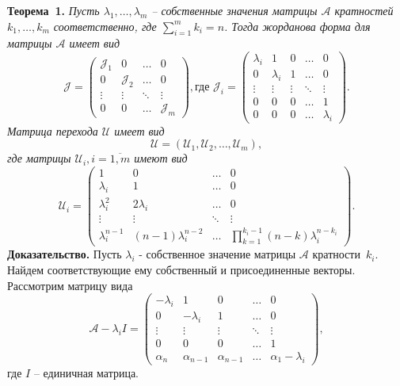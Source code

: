 \textbf{Теорема~1.}
{ \it Пусть $\lambda_1, \ldots , \lambda_m$ -- собственные значения матрицы $\mathcal{A}$ кратностей $k_1, \ldots , k_m$ соответственно, где $\sum\limits_{i=1}^m k_i = n$. Тогда жорданова форма для матрицы $\mathcal{A}$ имеет вид
$$
	\mathcal{J} = \begin{pmatrix}
		\mathcal{J}_1 & 0 & \dots & 0 \\
		0 & \mathcal{J}_2 & \dots & 0 \\
		\vdots & \vdots & \ddots & \vdots \\
		0 & 0 & \dots & \mathcal{J}_m
	\end{pmatrix}, {\text{где }}
	\mathcal{J}_i = \begin{pmatrix}
		\lambda_i & 1 & 0 & \dots & 0 \\
		0 & \lambda_i & 1 & \dots & 0 \\
		\vdots & \vdots & \vdots & \ddots & \vdots \\
		0 & 0 & 0 & \dots & 1 \\
		0 & 0 & 0 & \dots & \lambda_i
	\end{pmatrix}.
$$
Матрица перехода $\mathcal{U}$ имеет вид
$$
\mathcal{U} = \left( \mathcal{U}_1, \mathcal{U}_2, \dots, \mathcal{U}_m \right),
$$
где матрицы $\mathcal{U}_i, i= \overline{1,m}$ имеют вид
$$
\mathcal{U}_i = \begin{pmatrix}
1 & 0 & \dots & 0 \\
\lambda_i & 1 & \dots & 0 \\ 
\lambda_i^2 & 2\lambda_i & \dots & 0 \\
\vdots & \vdots & \ddots & \vdots \\
\lambda_i^{n-1} & (n-1)\lambda_i^{n-2} & \dots & \prod_{k=1}^{k_i-1}(n-k)\lambda_i^{n-k_i}
\end{pmatrix}.
$$
}
\textbf{Доказательство.} Пусть $\lambda_i$ - собственное значение матрицы $\mathcal{A}$ кратности~$k_i$. Найдем соответствующие ему собственный и присоединенные векторы. Рассмотрим матрицу вида
$$
\mathcal{A}-\lambda_i I = 
\begin{pmatrix}
	-\lambda_i & 1 & 0 & \dots & 0 \\
	0 & -\lambda_i & 1 & \dots & 0 \\
	\vdots & \vdots & \vdots & \ddots & \vdots \\
	0 & 0 & 0 & \dots & 1 \\
	\alpha_n & \alpha_{n-1} & \alpha_{n-1} & \dots & \alpha_1-\lambda_i
\end{pmatrix},
$$ 
где $I$ -- единичная матрица.\\
